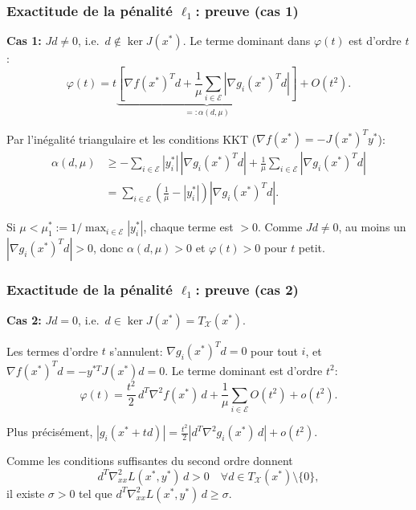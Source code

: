 \documentclass[t,usepdftitle=false,aspectratio=169]{beamer}
\def\cE{\mathcal{E}}
\def\cX{\mathcal{X}}
\begin{document}
\begin{frame}
\frametitle{Exactitude de la pénalité $\ell_1$: preuve (cas 1)}

\textbf{Cas 1:} $Jd \ne 0$, i.e.\ $d \notin \ker J(x^*)$.
Le terme dominant dans $\varphi(t)$ est d'ordre $t$:
$$
\varphi(t) = t\underbrace{\left[\nabla f(x^*)^Td + \frac{1}{\mu}\sum_{i \in \cE} |\nabla g_i(x^*)^Td|\right]}_{\displaystyle =: \alpha(d,\mu)} + O(t^2).
$$

Par l'inégalité triangulaire et les conditions KKT ($\nabla f(x^*) = -J(x^*)^Ty^*$):
\begin{align*}
\alpha(d,\mu) &\geq -\sum_{i \in \cE} |y_i^*|\,|\nabla g_i(x^*)^Td| + \frac{1}{\mu}\sum_{i \in \cE} |\nabla g_i(x^*)^Td| \\
&= \sum_{i \in \cE} \left(\frac{1}{\mu} - |y_i^*|\right)|\nabla g_i(x^*)^Td|.
\end{align*}

Si $\mu < \mu_1^* := 1/\max_{i \in \cE}|y_i^*|$, chaque terme est $> 0$. Comme $Jd \ne 0$, au moins un $|\nabla g_i(x^*)^Td| > 0$, donc $\alpha(d,\mu) > 0$ et $\varphi(t) > 0$ pour $t$ petit.

\end{frame}

\begin{frame}
\frametitle{Exactitude de la pénalité $\ell_1$: preuve (cas 2)}

\textbf{Cas 2:} $Jd = 0$, i.e.\ $d \in \ker J(x^*) = T_{\cX}(x^*)$.

Les termes d'ordre $t$ s'annulent: $\nabla g_i(x^*)^Td = 0$ pour tout $i$, et
$\nabla f(x^*)^Td = -y^{*T}J(x^*)d = 0$.
Le terme dominant est d'ordre $t^2$:
$$
\varphi(t) = \frac{t^2}{2}\,d^T\nabla^2 f(x^*)\,d + \frac{1}{\mu}\sum_{i \in \cE} O(t^2) + o(t^2).
$$

Plus précisément, $|g_i(x^*+td)| = \frac{t^2}{2}|d^T\nabla^2 g_i(x^*)\,d| + o(t^2)$.

\mbox{}

Comme les conditions suffisantes du second ordre donnent
$$
d^T\nabla^2_{xx}L(x^*,y^*)\,d > 0 \quad \forall d \in T_{\cX}(x^*) \setminus \{0\},
$$
il existe $\sigma > 0$ tel que $d^T\nabla^2_{xx}L(x^*,y^*)\,d \geq \sigma$.

\end{frame}
\end{document}
